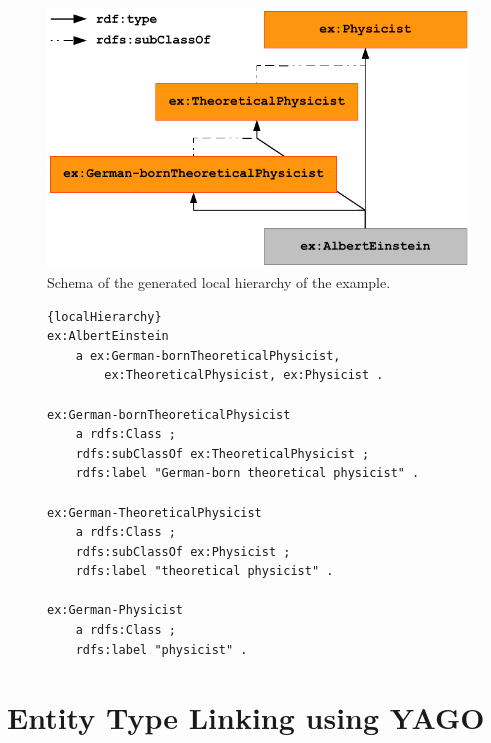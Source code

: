 \begin{figure}
\centering
\includegraphics[scale=0.8]{chapter_three/unstructured_annotation/fig/localHierarchy.pdf}
\caption{Schema of the generated local hierarchy of the example.}
\label{fig:localHierarchy}
\end{figure}

\begin{figure}
\begin{lstlisting}[label=lst:localHierarchy,caption=The local hierarchy that is generated from the extracted string expressed using turtle.]{localHierarchy}
ex:AlbertEinstein
    a ex:German-bornTheoreticalPhysicist, 
        ex:TheoreticalPhysicist, ex:Physicist .

ex:German-bornTheoreticalPhysicist
    a rdfs:Class ;
    rdfs:subClassOf ex:TheoreticalPhysicist ;
    rdfs:label "German-born theoretical physicist" .

ex:German-TheoreticalPhysicist
    a rdfs:Class ;
    rdfs:subClassOf ex:Physicist ;
    rdfs:label "theoretical physicist" .

ex:German-Physicist
    a rdfs:Class ;
    rdfs:label "physicist" .

\end{lstlisting}
\end{figure}

\section{Entity Type Linking using YAGO}
\label{sec:linkingyago}


